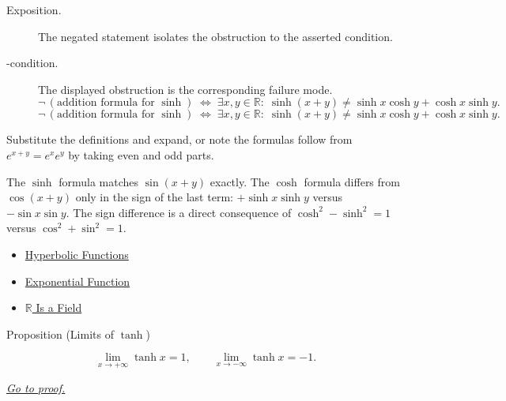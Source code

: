 \begin{remark*}
\begin{description}
  \item[Exposition.]
  The negated statement isolates the obstruction to the asserted condition.

  \item[\neq-condition.]
  The displayed obstruction is the corresponding failure mode.
  \[
\neg\,(\text{addition formula for }\sinh)
  \;\iff\;
  \exists x,y\in\mathbb{R}:\;
  \sinh(x+y) \neq \sinh x\cosh y + \cosh x\sinh y.
  \]
  \[
\neg\,(\text{addition formula for }\sinh)
  \;\iff\;
  \exists x,y\in\mathbb{R}:\;
  \sinh(x+y) \neq \sinh x\cosh y + \cosh x\sinh y.
  \]
\end{description}
\end{remark*}



\begin{remark*}[Interpretation]
Substitute the definitions and expand, or note the formulas follow
from $e^{x+y} = e^x e^y$ by taking even and odd parts.


The $\sinh$ formula matches $\sin(x+y)$ exactly. The $\cosh$ formula
differs from $\cos(x+y)$ only in the sign of the last term:
$+\sinh x\sinh y$ versus $-\sin x\sin y$. The sign difference is a
direct consequence of $\cosh^2 - \sinh^2 = 1$ versus
$\cos^2 + \sin^2 = 1$.
\end{remark*}

\begin{dependencies}
\begin{itemize}
  \item \hyperref[def:hyperbolic]{Hyperbolic Functions}
  \item \hyperref[def:exponential]{Exponential Function}
  \item \hyperref[thm:r-is-a-field]{$\mathbb{R}$ Is a Field}
\end{itemize}
\end{dependencies}


\begin{propositionbox}{Proposition (Limits of $\tanh$)}
\begin{proposition}
\label{prop:tanh-limits}
\[
  \lim_{x \to +\infty} \tanh x = 1,
  \qquad
  \lim_{x \to -\infty} \tanh x = -1.
\]

\smallskip\noindent


\hyperref[prf:tanh-limits]{\textit{Go to proof.}}
\end{proposition}
\end{propositionbox}

